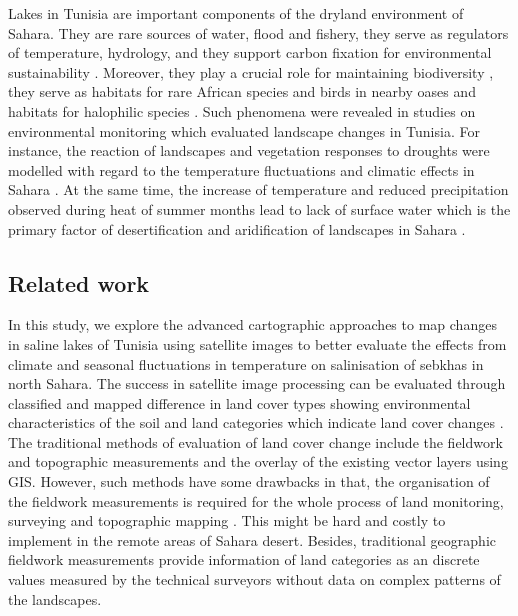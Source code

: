\documentclass[environments,article,submit,pdftex,moreauthors]{Definitions/mdpi}
\begin{document}
Lakes in Tunisia are important components of the dryland environment of Sahara. They are rare sources of water, flood and fishery, they serve as regulators of temperature, hydrology, and they support carbon fixation for environmental sustainability \cite{NIGAM2020201}. Moreover, they play a crucial role for maintaining biodiversity \cite{Neji}, they serve as habitats for rare African species and birds in nearby oases \cite{Baduel,RADDADI2022104806,Kamel} and habitats for halophilic species \cite{NEIFAR20191802}. Such phenomena were revealed in studies on environmental monitoring which evaluated landscape changes in Tunisia. For instance, the reaction of landscapes and vegetation responses to droughts were modelled with regard to the temperature fluctuations and climatic effects in Sahara \cite{HANAFI2008557,PAUSATA2020235,Lemenkova202313}. At the same time, the increase of temperature and reduced precipitation observed during heat of summer months lead to lack of surface water which is the primary factor of desertification and aridification of landscapes in Sahara \cite{OSWALD2023369,DODORICO2013326}. 

\subsection{Related work}

In this study, we explore the advanced cartographic approaches to map changes in saline lakes of Tunisia using satellite images to better evaluate the effects from climate and seasonal fluctuations in temperature on salinisation of sebkhas in north Sahara. The success in satellite image processing can be evaluated through classified and mapped difference in land cover types showing environmental characteristics of the soil and land categories which indicate land cover changes  \cite{Shoshany}. The traditional methods of evaluation of land cover change include the fieldwork and topographic measurements and the overlay of the existing vector layers using GIS. However, such methods have some drawbacks in that, the organisation of the fieldwork measurements is required for the whole process of land monitoring, surveying and topographic mapping \cite{JENDOUBI2020100507}. This might be hard and costly to implement in the remote areas of Sahara desert. Besides, traditional geographic fieldwork measurements provide information of land categories as an discrete values measured by the technical surveyors without data on complex patterns of the landscapes. 
\end{document}
